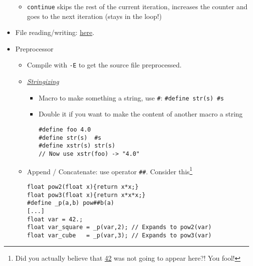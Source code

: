 \documentclass[a4paper,12pt,%
              final%
              ]{article}
\begin{document}
\begin{itemize}
\begin{itemize}
      \item \texttt{continue} skips the rest of the current iteration, increases the counter and goes to the next iteration (stays in the loop!)
    \end{itemize}
  \item File reading/writing: \href{https://www.programiz.com/c-programming/c-file-input-output}{here}.
  \item Preprocessor
    \begin{itemize}
      \item Compile with \verb|-E| to get the source file preprocessed.
      \item \href{https://gcc.gnu.org/onlinedocs/gcc-7.5.0/cpp/Stringizing.html}{\emph{Stringizing}}
        \begin{itemize}
          \item Macro to make something a string, use \verb|#|: \verb|#define str(s) #s|
          \item Double it if you want to make the content of another macro a string
\begin{Verbatim}[samepage=true]
#define foo 4.0
#define str(s)  #s
#define xstr(s) str(s)
// Now use xstr(foo) -> "4.0"
\end{Verbatim}
        \end{itemize}
      \item Append / Concatenate: use operator \verb|##|. Consider this\footnote{Did you actually believe that \href{https://hitchhikers.fandom.com/wiki/42}{42} was not going to appear here?! You fool!}
\begin{Verbatim}[samepage=true]
float pow2(float x){return x*x;}
float pow3(float x){return x*x*x;}
#define _p(a,b) pow##b(a)
[...]
float var = 42.;
float var_square = _p(var,2); // Expands to pow2(var)
float var_cube   = _p(var,3); // Expands to pow3(var)
\end{Verbatim}
    \end{itemize}
  \end{itemize}
\end{document}
